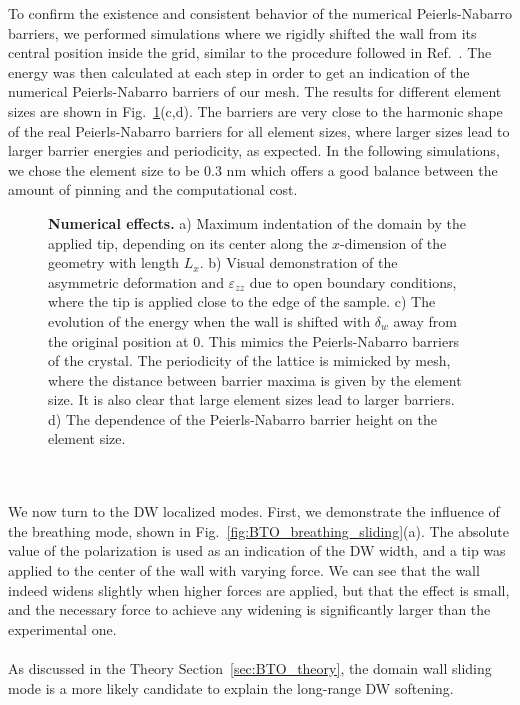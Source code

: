 To confirm the existence and consistent behavior of the numerical Peierls-Nabarro barriers, we performed simulations where we rigidly shifted the wall from its central position inside the grid, similar to the procedure followed in Ref.~\cite{Marton2018}.
The energy was then calculated at each step in order to get an indication of the numerical Peierls-Nabarro barriers of our mesh.
The results for different element sizes are shown in Fig.~\ref{fig:BTO_numerical_effects}(c,d).
The barriers are very close to the harmonic shape of the real Peierls-Nabarro barriers for all element sizes, where larger sizes lead to larger barrier energies and periodicity, as expected.
In the following simulations, we chose the element size to be 0.3 nm which offers a good balance between the amount of pinning and the computational cost. 
\begin{figure}[h!]
	\caption{\label{fig:BTO_numerical_effects}{\bf Numerical effects.} a) Maximum indentation of the domain by the applied tip, depending on its center along the $x$-dimension of the geometry with length $L_x$. b) Visual demonstration of the asymmetric deformation and $\varepsilon_{zz}$ due to open boundary conditions, where the tip is applied close to the edge of the sample. c) The evolution of the energy when the wall is shifted with $\delta_w$ away from the original position at 0. This mimics the Peierls-Nabarro barriers of the crystal. The periodicity of the lattice is mimicked by mesh, where the distance between barrier maxima is given by the element size. It is also clear that large element sizes lead to larger barriers. d) The dependence of the Peierls-Nabarro barrier height on the element size.}
\end{figure}
\\\\
We now turn to the DW localized modes.
First, we demonstrate the influence of the breathing mode, shown in Fig.~\ref{fig:BTO_breathing_sliding}(a).
The absolute value of the polarization is used as an indication of the DW width, and a tip was applied to the center of the wall with varying force.
We can see that the wall indeed widens slightly when higher forces are applied, but that the effect is small, and the necessary force to achieve any widening is significantly larger than the experimental one.
\\\\
As discussed in the Theory Section~\ref{sec:BTO_theory}, the domain wall sliding mode is a more likely candidate to explain the long-range DW softening.
